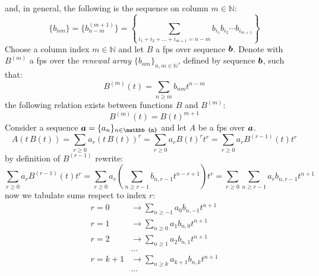 and, in general, the following is the sequence on column $m\in\mathbb{N}$:
\begin{displaymath}
    \lbrace b_{nm}\rbrace
        =\lbrace b_{n-m}^{(m+1)}\rbrace
        =\left\lbrace \sum_{i_{1}+i_{2}+\ldots+i_{m+1} =n-m}
            {b_{i_{1}}b_{i_{2}}\cdots b_{i_{m+1}}}\right\rbrace
\end{displaymath}
Choose a column index $m\in\mathbb{N}$ and let $B$ a \ac{fps} over sequence $\boldsymbol{b}$.
Denote with $B^{(m)}$ a \ac{fps} over the \emph{renewal array} 
$\lbrace b_{nm} \rbrace_{n,m\in\mathbb{N}}$, defined by sequence $\boldsymbol{b}$, 
such that:
\begin{displaymath}
    B^{(m)}(t) = \sum_{n\geq m}{b_{nm}t^{n-m}}
\end{displaymath}
the following relation exists between functions $B$ and $B^{(m)}$:
\begin{displaymath}
    B^{(m)}(t) = B(t)^{m+1}
\end{displaymath}
Consider a sequence
$\vect{a}=\lbrace a_{n} \rbrace_{n\in\mathbb{n}}$ and let $A$ be
a \ac{fps} over $\boldsymbol{a}$.
\begin{displaymath}
    A\left(t\,B(t)\right) 
        = \sum_{r\geq 0}{a_{r}\left(t\,B(t)\right)^{r}}
        = \sum_{r\geq 0}{a_{r}B(t)^{r}t^{r}}
        = \sum_{r\geq 0}{a_{r}B^{(r-1)}(t)t^{r}}
\end{displaymath}
by definition of $B^{(r-1)}$ rewrite:
\begin{displaymath}
    \sum_{r\geq 0}{a_{r}B^{(r-1)}(t)t^{r}}
        =\sum_{r\geq 0}{a_{r}\left(\sum_{n\geq r-1}{b_{n,r-1}t^{n-r+1}}\right)t^{r}}
        =\sum_{r\geq 0}{\sum_{n\geq r-1}{a_{r}b_{n,r-1}t^{n+1}}}
\end{displaymath}
now we tabulate sums respect to index $r$:
\begin{displaymath}
    \begin{split}
        r=0 &\rightarrow \sum_{n\geq -1}{a_{0}b_{n,-1}t^{n+1}}\\
        r=1 &\rightarrow \sum_{n\geq 0}{a_{1}b_{n,0}t^{n+1}}\\
        r=2 &\rightarrow \sum_{n\geq 1}{a_{2}b_{n,1}t^{n+1}}\\
        &\ldots\\
        r=k+1 &\rightarrow \sum_{n\geq k}{a_{k+1}b_{n,k}t^{n+1}}\\
        &\ldots\\
    \end{split}
\end{displaymath}
